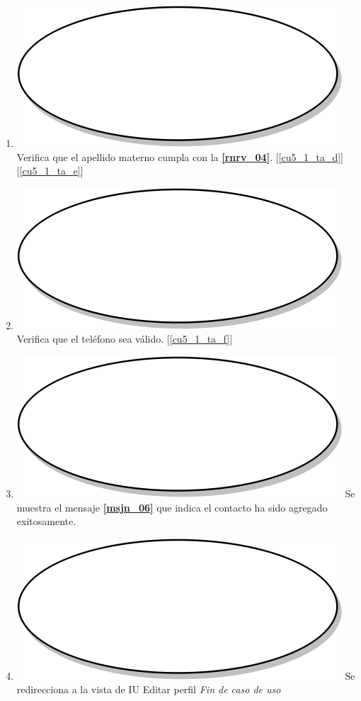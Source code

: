 \begin{enumerate}
  \item {\includegraphics[scale=.05]{Capitulo3/img/proceso.png} Verifica que el apellido materno cumpla con la \textbf{\ref{rnrv_04}}. [\ref{cu5_1_ta_d}] [\ref{cu5_1_ta_e}]}
  \item {\includegraphics[scale=.05]{Capitulo3/img/proceso.png} Verifica que el teléfono sea válido. [\ref{cu5_1_ta_f}]}
  \item {\includegraphics[scale=.05]{Capitulo3/img/proceso.png} Se muestra el mensaje \textbf{\ref{msjn_06}} que indica el contacto ha sido agregado exitosamente.}
\item {\includegraphics[scale=.05]{Capitulo3/img/proceso.png} Se redirecciona a la vista de IU Editar perfil}
  \textit{Fin de caso de uso} \\  
\end{enumerate}

